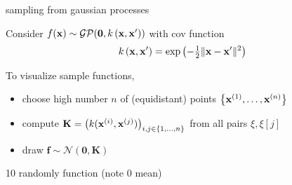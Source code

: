 \documentclass[11pt,compress,t,notes=noshow, xcolor=table]{beamer}
\begin{document}
\begin{framei}[sep=L]{sampling from gaussian processes}
\item Consider $\fx \sim \mathcal{GP}(\zero, \kxxp)$ with cov function
$$ \kxxp = \exp\left(-\tfrac{1}{2}\|\xv - \xv^\prime\|^2\right)$$
\item To visualize sample functions, 
\begin{itemize}
\item choose high number $n$ of (equidistant) points $\xdat$
  \item compute $\Kmat = \left(k(\xi, \xi[j]) \right)_{i,j \in \nset}$ from all pairs $\xi, \xi[j]$ 
  \item draw $\bm{f} \sim \mathcal{N}(\bm{0}, \bm{K})$ 
\end{itemize}
\item 10 randomly function (note 0 mean)
\vfill
{}
\end{framei}

\endlecture
\end{document}
